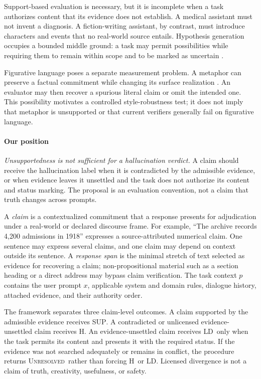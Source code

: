 \documentclass{clv2025}
\newcommand{\LD}{\textsc{LD}}
\newcommand{\Hall}{\textsc{H}}
\newcommand{\SUP}{\textsc{SUP}}
\newcommand{\UNR}{\textsc{Unresolved}}
\begin{document}
Support-based evaluation is necessary, but it is incomplete when a task authorizes content that its evidence does not establish.
A medical assistant must not invent a diagnosis.
A fiction-writing assistant, by contrast, must introduce characters and events that no real-world source entails.
Hypothesis generation occupies a bounded middle ground: a task may permit possibilities while requiring them to remain within scope and to be marked as uncertain \citep{jiang_survey_2024,franceschelli_creativity_2024}.

Figurative language poses a separate measurement problem.
A metaphor can preserve a factual commitment while changing its surface realization \citep{badathala_match_2023,jin_deep_2022}.
An evaluator may then recover a spurious literal claim or omit the intended one.
This possibility motivates a controlled style-robustness test; it does not imply that metaphor is unsupported or that current verifiers generally fail on figurative language.

\paragraph{Our position}
\emph{Unsupportedness is not sufficient for a hallucination verdict.}
A claim should receive the hallucination label when it is contradicted by the admissible evidence, or when evidence leaves it unsettled and the task does not authorize its content and status marking.
The proposal is an evaluation convention, not a claim that truth changes across prompts.

A \emph{claim} is a contextualized commitment that a response presents for adjudication under a real-world or declared discourse frame.
For example, ``The archive records 4,200 admissions in 1918'' expresses a source-attributed numerical claim.
One sentence may express several claims, and one claim may depend on context outside its sentence.
A \emph{response span} is the minimal stretch of text selected as evidence for recovering a claim; non-propositional material such as a section heading or a direct address may bypass claim verification.
The task context $p$ contains the user prompt $x$, applicable system and domain rules, dialogue history, attached evidence, and their authority order.

The framework separates three claim-level outcomes.
A claim supported by the admissible evidence receives \SUP.
A contradicted or unlicensed evidence-unsettled claim receives \Hall.
An evidence-unsettled claim receives \LD\ only when the task permits its content and presents it with the required status.
If the evidence was not searched adequately or remains in conflict, the procedure returns \UNR\ rather than forcing \Hall\ or \LD.
Licensed divergence is not a claim of truth, creativity, usefulness, or safety.
\end{document}

